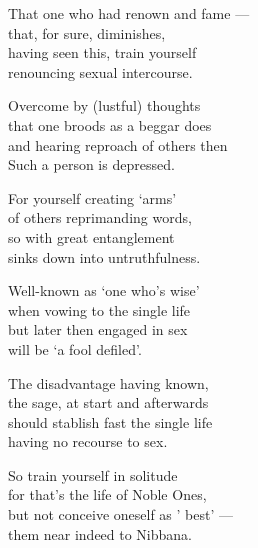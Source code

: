\begin{MyDescription}{}
That one who had renown and fame —\\
that, for sure, diminishes,\\
having seen this, train yourself\\
renouncing sexual intercourse.
\end{MyDescription}

\begin{MyDescription}{}
Overcome by (lustful) thoughts\\
that one broods as a beggar does\\
and hearing reproach of others then\\
Such a person is depressed.
\end{MyDescription}

\begin{MyDescription}{}
For yourself creating `arms'\\
of others reprimanding words,\\
so with great entanglement\\
sinks down into untruthfulness.
\end{MyDescription}

\begin{MyDescription}{}
Well-known as `one who's wise'\\
when vowing to the single life\\
but later then engaged in sex\\
will be `a fool defiled'.
\end{MyDescription}

\begin{MyDescription}{}
The disadvantage having known,\\
the sage, at start and afterwards\\
should stablish fast the single life\\
having no recourse to sex.
\end{MyDescription}

\begin{MyDescription}{}
So train yourself in solitude\\
for that's the life of Noble Ones,\\
but not conceive oneself as ' best' —\\
them near indeed to Nibbana.
\end{MyDescription}

